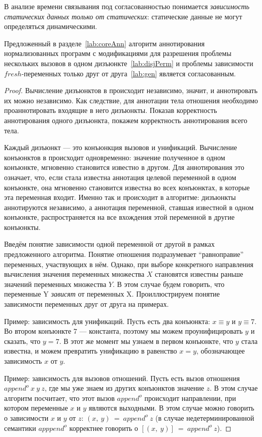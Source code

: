 В анализе времени связывания под согласованностью понимается \emph{зависимость статических данных только от статических}: статические данные не могут определяться динамическими.

\begin{theorem} 
Предложенный в разделе~\ref{lab:coreAnn} алгоритм аннотирования нормализованных программ с модификациями для разрешения проблемы нескольких вызовов в одном дизъюнкте~\ref{lab:disjPerm} и проблемы зависимости $fresh$-переменных только друг от друга~\ref{lab:gen} является согласованным.
\end{theorem}

\begin{proof}
Вычисление дизъюнктов в \miniKanren{} происходит независимо, значит, и аннотировать их можно независимо.
Как следствие, для аннотации тела отношения необходимо проаннотировать входящие в него дизъюнкты.
Показав корректность аннотирования одного дизъюнкта, покажем корректность аннотирования всего тела.

Каждый дизъюнкт --- это конъюнкция вызовов и унификаций.
Вычисление конъюнктов в \miniKanren{} происходит одновременно: значение полученное в одном конъюнкте, мгновенно становится известно в другом.
Для аннотирования это означает, что, если стала известна аннотация целевой переменной в одном конъюнкте, она мгновенно становится известна во всех конъюнктах, в которые эта переменная входит.
Именно так и происходит в алгоритме: дизъюнкты аннотируются независимо, а аннотация переменной, ставшая известной в одном конъюнкте, распространяется на все вхождения этой переменной в другие конъюнкты.

Введём понятие зависимости одной переменной от другой в рамках предложенного алгоритма.
Понятие отношения подразумевает ``равноправие'' переменных, участвующих в нём.
Однако, при выборе конкретного направления вычисления значения переменных множества $X$ становятся известны раньше значений переменных множества $Y$.
В этом случае будем говорить, что переменные Y \emph{зависят} от переменных X.
Проиллюстрируем понятие зависимости переменных друг от друга на примерах.

Пример: зависимость для унификаций.
Пусть есть два конъюнкта: $x \equiv y$ и $y \equiv 7$.
Во втором конъюнкте $7$ --- константа, поэтому мы можем проунифицировать $y$ и сказать, что $y = 7$.
В этот же момент мы узнаем в первом конъюнкте, что $y$ стала известна, и можем превратить унификацию в равенство $x = y$, обозначающее зависимость $x$ от $y$.

Пример: зависимость для вызовов отношений.
Пусть есть вызов отношения $append^o~x~y~z$, где мы уже знаем из других конъюнктов значение $z$.
В этом случае алгоритм посчитает, что этот вызов $append^o$ происходит направлении, при котором переменные $x$ и $y$ являются выходными.
В этом случае можно говорить о зависимости $x$ и $y$ от $z$: $(x,~y)~=~append^o~z$ (в случае недетерминированной семантики $apppend^o$ корректнее говорить о $[(x,~y)]~=~append^o~z$).


\end{proof}
